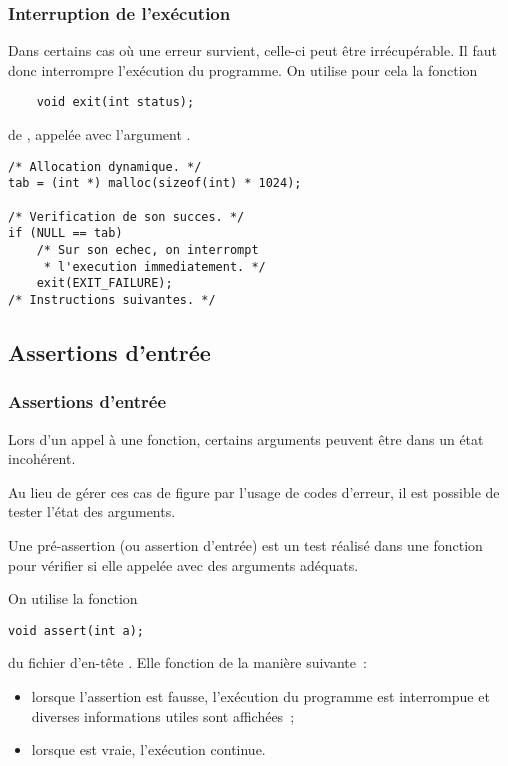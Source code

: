 \begin{frame}[fragile] \frametitle{Interruption de l'exécution}
Dans certains cas où une erreur survient, celle-ci peut être 
irrécupérable. Il faut donc \alert{interrompre l'exécution} du programme. 
On utilise pour cela la fonction
\begin{lstlisting}
    void exit(int status);
\end{lstlisting}
de , appelée avec l'argument .
\medskip

\begin{lstlisting}
/* Allocation dynamique. */
tab = (int *) malloc(sizeof(int) * 1024);

/* Verification de son succes. */
if (NULL == tab)
    /* Sur son echec, on interrompt
     * l'execution immediatement. */
    exit(EXIT_FAILURE);
/* Instructions suivantes. */
\end{lstlisting}
\end{frame}

\subsection{Assertions d'entrée}

\begin{frame}[fragile] \frametitle{Assertions d'entrée}
Lors d'un appel à une fonction, certains arguments peuvent être dans un 
état incohérent.
\medskip

Au lieu de gérer ces cas de figure par l'usage de codes d'erreur, il est
possible de tester l'état des arguments.
\medskip

Une \alert{pré-assertion} (ou assertion d'entrée) est un test réalisé 
dans une fonction pour vérifier si elle appelée avec des arguments 
adéquats.
\bigskip

On utilise la fonction 
\begin{lstlisting}
void assert(int a);
\end{lstlisting} 
du fichier d’en-tête . Elle fonction de la manière 
suivante~:

\begin{itemize}
    \item lorsque l'assertion  est fausse, l’exécution du 
    programme est interrompue et diverses informations utiles sont 
    affichées~;
    \smallskip
    
    \item lorsque  est vraie, l'exécution continue.
\end{itemize}
\end{frame}

